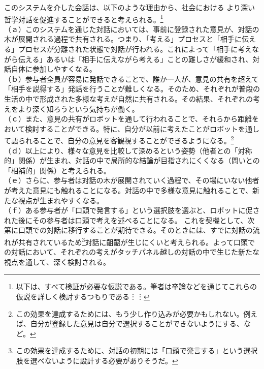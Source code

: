 \documentclass[9pt,b5j,twoside,twocolumn]{utarticle}
\begin{document}
このシステムを介した会話は、以下のような理由から、社会における
より深い哲学対話を促進することができると考えられる。\footnote{以下は、すべて検証が必要な仮説である。筆者は卒論などを通じてこれらの仮説を詳しく検討するつもりである︙︙}\\
（ａ）このシステムを通じた対話においては、事前に登録された意見が、対話の木が展開される過程で共有される。つまり、「考える」プロセスと「相手に伝える」プロセスが分離された状態で対話が行われる。これによって「相手に考えながら伝える」あるいは「相手に伝えながら考える」ことの難しさが緩和され、対話自体に参加しやすくなる。\\
（ｂ）参与者全員が容易に発話できることで、誰か一人が、意見の共有を超えて「相手を説得する」発話を行うことが難しくなる。そのため、それぞれが普段の生活の中で形成された多様な考えが自然に共有される。その結果、それぞれの考えをより深く知ろうという気持ちが働く。\\
（ｃ）また、意見の共有がロボットを通して行われることで、それらから距離をおいて検討することができる。特に、自分が以前に考えたことがロボットを通して語られることで、自分の意見を客観視することができるようになる。\footnote{この効果を達成するためには、もう少し作り込みが必要かもしれない。例えば、自分が登録した意見は自分で選択することができないようにする、など。}\\
（ｄ）以上により、様々な意見を比較して深めるという姿勢（他者との「対称的」関係）が生まれ、対話の中で局所的な結論が目指されにくくなる（問いとの「相補的」関係）と考えられる。\\%
（ｅ）さらに、参与者は対話の木が展開されていく過程で、その場にいない他者が考えた意見にも触れることになる。対話の中で多様な意見に触れることで、新たな視点が生まれやすくなる。\\
（ｆ）ある参与者が「口頭で発言する」という選択肢を選ぶと、ロボットに促された後にその参与者は口頭で考えを述べることになる。
これを契機として、次第に口頭での対話に移行することが期待できる。そのときには、すでに対話の流れが共有されているため\footnote{この効果を達成するために、対話の初期には「口頭で発言する」という選択肢を選べないように設計する必要がありそうだ。}対話に齟齬が生じにくいと考えられる。よって口頭での対話において、それぞれの考えがタッチパネル越しの対話の中で生じた新たな視点を通して、深く検討される。\\
\end{document}
